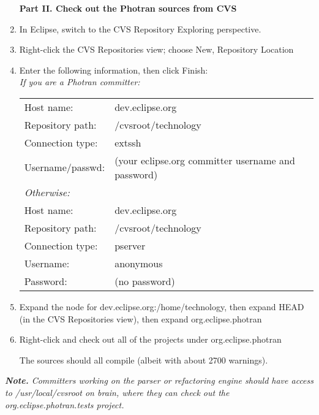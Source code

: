 \begin{enumerate}
\vspace{.5em}
\noindent\textbf{Part II.  Check out the Photran sources from CVS}

\item In Eclipse, switch to the CVS Repository Exploring perspective.
\item Right-click the CVS Repositories view; choose New, Repository Location
\item Enter the following information, then click Finish: \\
\textit{If you are a Photran committer:} \\
\begin{tabular}{ll}
        Host name:       & dev.eclipse.org \\
        Repository path: & /cvsroot/technology \\
        Connection type: & extssh \\
        Username/passwd: & (your eclipse.org committer username and password) \\
\textit{Otherwise:} \\
        Host name:       & dev.eclipse.org \\
        Repository path: & /cvsroot/technology \\
        Connection type: & pserver \\
        Username:        & anonymous \\
        Password:        & (no password) \\
\end{tabular}
\item Expand the node for dev.eclipse.org:/home/technology,
    then expand HEAD (in the CVS Repositories view), then expand
    org.eclipse.photran
\item Right-click and check out all of the projects under org.eclipse.photran

The sources should all compile (albeit with about 2700 warnings).

\end{enumerate}

\noindent\textit{\textbf{Note.} Committers working on the parser or refactoring
engine should have access to /usr/local/cvsroot on brain, where they can
check out the org.eclipse.photran.tests project.}
